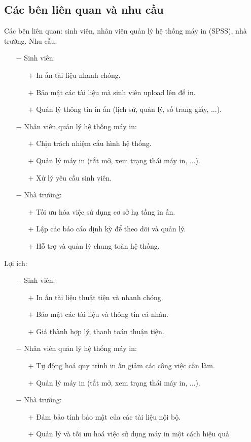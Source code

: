 \documentclass[a4paper]{article}
\begin{document}
\subsection{Các bên liên quan và nhu cầu}
Các bên liên quan: sinh viên, nhân viên quản lý hệ thống máy in (SPSS), nhà trường.
Nhu cầu:
\begin{itemize}
    \item[$-$] Sinh viên:
    \begin{itemize}
        \item[$+$] In ấn tài liệu nhanh chóng.
        \item[$+$] Bảo mật các tài liệu mà sinh viên upload lên để in.
        \item[$+$] Quản lý thông tin in ấn (lịch sử, quản lý, số trang giấy, ...).
    \end{itemize}
    \item[$-$] Nhân viên quản lý hệ thống máy in:
    \begin{itemize}
        \item[$+$] Chịu trách nhiệm cấu hình hệ thống.
        \item[$+$] Quản lý máy in (tắt mở, xem trạng thái máy in, ...).
        \item[$+$] Xử lý yêu cầu sinh viên.
    \end{itemize}
    \item[$-$] Nhà trường:
    \begin{itemize}
        \item[$+$] Tối ưu hóa việc sử dụng cơ sở hạ tầng in ấn.
        \item[$+$] Lập các báo cáo dịnh kỳ để theo dõi và quản lý.
        \item[$+$] Hỗ trợ và quản lý chung toàn hệ thống.
    \end{itemize}
\end{itemize}
Lợi ích:
\begin{itemize}
    \item[$-$] Sinh viên:
    \begin{itemize}
        \item[$+$] In ấn tài liệu thuật tiện và nhanh chóng.
        \item[$+$] Bảo mật các tài liệu và thông tin cá nhân.
        \item[$+$] Giá thành hợp lý, thanh toán thuận tiện.
    \end{itemize}
    \item[$-$] Nhân viên quản lý hệ thống máy in:
    \begin{itemize}
        \item[$+$] Tự động hoá quy trình in ấn giảm các công việc cần làm.
        \item[$+$] Quản lý máy in (tắt mở, xem trạng thái máy in, ...).
    \end{itemize}
    \item[$-$] Nhà trường:
    \begin{itemize}
        \item[$+$] Đảm bảo tính bảo mật của các tài liệu nội bộ.
        \item[$+$] Quản lý và tối ưu hoá việc sử dụng máy in một cách hiệu quả
    \end{itemize}
\end{itemize}
\newpage
\end{document}
